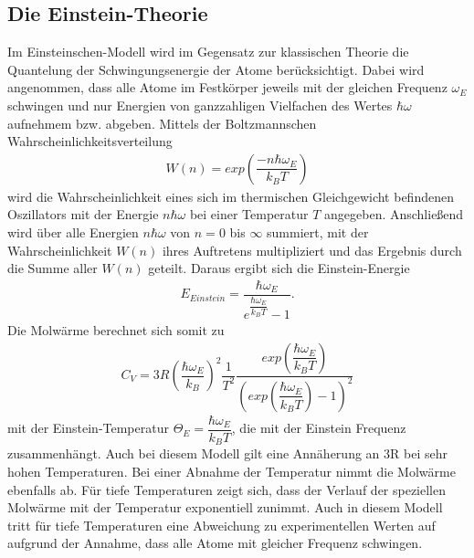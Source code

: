 \documentclass{article}
\begin{document}
\subsection{Die Einstein-Theorie}
Im Einsteinschen-Modell wird im Gegensatz zur klassischen Theorie die Quantelung der Schwingungsenergie der Atome berücksichtigt. Dabei wird angenommen, dass alle Atome im Festkörper jeweils mit der gleichen Frequenz $\omega_E$ schwingen und nur Energien von ganzzahligen Vielfachen des Wertes $\hbar\omega$ aufnehmem bzw. abgeben. Mittels der Boltzmannschen Wahrscheinlichkeitsverteilung 
\begin{align}
W(n)=exp\left(\dfrac{-n\hbar \omega_E}{k_BT}\right)
\end{align}
wird die Wahrscheinlichkeit eines sich im thermischen Gleichgewicht befindenen Oszillators mit der Energie $n\hbar\omega$ bei einer Temperatur $T$ angegeben. Anschließend wird über alle Energien $n \hbar \omega$ von $n=0$ bis $\infty$ summiert, mit der Wahrscheinlichkeit $W(n)$ ihres Auftretens multipliziert und das Ergebnis durch die Summe aller $W(n)$ geteilt. Daraus ergibt sich die Einstein-Energie
\begin{align}
E_{Einstein}=\dfrac{\hbar\omega_E}{e^{\dfrac{\hbar \omega_E}{k_BT}}-1}.
\end{align}
Die Molwärme berechnet sich somit zu 
\begin{align}
C_V=3R\left(\dfrac{\hbar\omega_E}{k_B}\right)^2 \dfrac{1}{T^2} \dfrac{exp\left(\dfrac{\hbar\omega_E}{k_BT}\right)}{\left(exp\left(\dfrac{\hbar \omega_E }{k_BT}\right)-1\right)^2}
\end{align}
mit der Einstein-Temperatur $\Theta_E=\dfrac{\hbar \omega_E}{k_BT}$, die mit der Einstein Frequenz zusammenhängt. Auch bei diesem Modell gilt eine Annäherung an 3R bei sehr hohen Temperaturen. Bei einer Abnahme der Temperatur nimmt die Molwärme ebenfalls ab. Für tiefe Temperaturen zeigt sich, dass der Verlauf der speziellen Molwärme mit der Temperatur exponentiell zunimmt. Auch in diesem Modell tritt für tiefe Temperaturen eine Abweichung zu experimentellen Werten auf aufgrund der Annahme, dass alle Atome mit gleicher Frequenz schwingen. 
\end{document}
